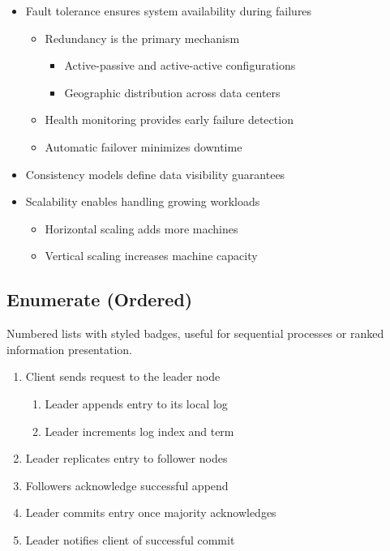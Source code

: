 \documentclass[12pt]{article}
\begin{document}
\begin{itemize}
  \item Fault tolerance ensures system availability during failures
    \begin{itemize}
      \item Redundancy is the primary mechanism
        \begin{itemize}
          \item Active-passive and active-active configurations
          \item Geographic distribution across data centers
        \end{itemize}
      \item Health monitoring provides early failure detection
      \item Automatic failover minimizes downtime
    \end{itemize}
  \item Consistency models define data visibility guarantees
  \item Scalability enables handling growing workloads
    \begin{itemize}
      \item Horizontal scaling adds more machines
      \item Vertical scaling increases machine capacity
    \end{itemize}
\end{itemize}

\subsection{Enumerate (Ordered)}
Numbered lists with styled badges, useful for sequential processes
or ranked information presentation.

\begin{enumerate}
  \item Client sends request to the leader node
    \begin{enumerate}
      \item Leader appends entry to its local log
      \item Leader increments log index and term
    \end{enumerate}
  \item Leader replicates entry to follower nodes
  \item Followers acknowledge successful append
  \item Leader commits entry once majority acknowledges
  \item Leader notifies client of successful commit
\end{enumerate}
\end{document}

